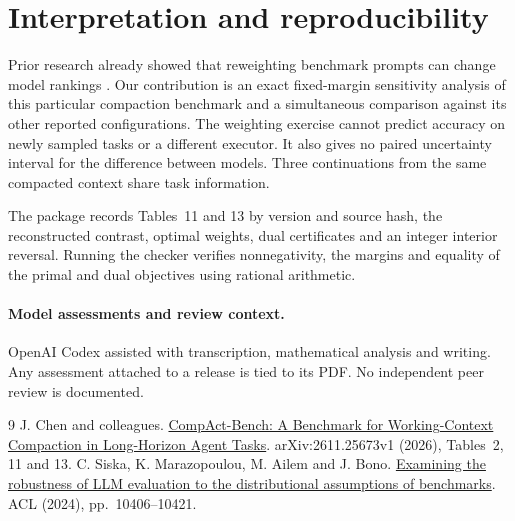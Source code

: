 \documentclass[11pt]{article}
\begin{document}
\section{Interpretation and reproducibility}
Prior research already showed that reweighting benchmark prompts can change model rankings \cite{siska}. Our contribution is an exact fixed-margin sensitivity analysis of this particular compaction benchmark and a simultaneous comparison against its other reported configurations. The weighting exercise cannot predict accuracy on newly sampled tasks or a different executor. It also gives no paired uncertainty interval for the difference between models. Three continuations from the same compacted context share task information.

The package records Tables~11 and 13 by version and source hash, the reconstructed contrast, optimal weights, dual certificates and an integer interior reversal. Running the checker verifies nonnegativity, the margins and equality of the primal and dual objectives using rational arithmetic.
\paragraph{Model assessments and review context.} OpenAI Codex assisted with transcription, mathematical analysis and writing. Any assessment attached to a release is tied to its PDF. No independent peer review is documented.
\begin{thebibliography}{9}
 J. Chen and colleagues. \href{https://arxiv.org/html/2611.25673v1}{CompAct-Bench: A Benchmark for Working-Context Compaction in Long-Horizon Agent Tasks}. arXiv:2611.25673v1 (2026), Tables~2, 11 and 13.
 C. Siska, K. Marazopoulou, M. Ailem and J. Bono. \href{https://aclanthology.org/2024.acl-long.560/}{Examining the robustness of LLM evaluation to the distributional assumptions of benchmarks}. ACL (2024), pp.~10406--10421.
\end{thebibliography}
\end{document}
